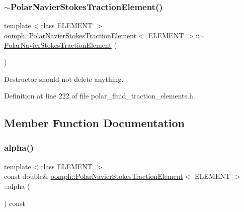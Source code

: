 \subsubsection{\texorpdfstring{$\sim$\+Polar\+Navier\+Stokes\+Traction\+Element()}{~PolarNavierStokesTractionElement()}}
{\footnotesize\ttfamily template$<$class E\+L\+E\+M\+E\+NT $>$ \\
\hyperlink{classoomph_1_1PolarNavierStokesTractionElement}{oomph\+::\+Polar\+Navier\+Stokes\+Traction\+Element}$<$ E\+L\+E\+M\+E\+NT $>$\+::$\sim$\hyperlink{classoomph_1_1PolarNavierStokesTractionElement}{Polar\+Navier\+Stokes\+Traction\+Element} (\begin{DoxyParamCaption}{ }\end{DoxyParamCaption})\hspace{0.3cm}{\ttfamily [inline]}}



Destructor should not delete anything. 



Definition at line 222 of file polar\+\_\+fluid\+\_\+traction\+\_\+elements.\+h.



\subsection{Member Function Documentation}
\mbox{\label{classoomph_1_1PolarNavierStokesTractionElement_af67d69b32f607b34b642f26b663a0777}} 
\subsubsection{\texorpdfstring{alpha()}{alpha()}}
{\footnotesize\ttfamily template$<$class E\+L\+E\+M\+E\+NT $>$ \\
const double\& \hyperlink{classoomph_1_1PolarNavierStokesTractionElement}{oomph\+::\+Polar\+Navier\+Stokes\+Traction\+Element}$<$ E\+L\+E\+M\+E\+NT $>$\+::alpha (\begin{DoxyParamCaption}{ }\end{DoxyParamCaption}) const\hspace{0.3cm}{\ttfamily [inline]}}




